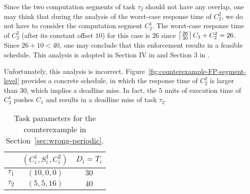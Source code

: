 Since the two computation segments of task $\tau_2$ should not have any overlap, one may think that during the analysis of the worst-case response time of $C_2^2$, we do not have to consider the computation segment $C_2^1$. The worst-case response time of $C_2^2$ (after its constant offset $10$) for this case is $26$ since $\left\lceil{\frac{26}{30}}\right\rceil C_1 + C_2^2 = 26$. 
Since $26+10 < 40$, one may conclude that this enforcement results in a feasible schedule. This analysis is adopted in Section IV in \cite{RTSS-KimANR13} and Section 3 in \cite{DBLP:journals/ieicet/DingTT09}. 

Unfortunately, this analysis is incorrect.
Figure~\ref{fig:counterexample-FP-segment-level} provides a concrete schedule, in which the response time of $C_2^2$ is larger than $30$, which implies a deadline miss. In fact, the $5$ units of execution time of $C_2^1$ pushes $C_1$ and results in a deadline miss of task $\tau_2$.

\begin{table} [t]
\centering
    \begin{tabular}{|c|c|c|}
 \hline
        & $(C_i^1, S_i^1, C_i^2)$ &  $D_i=T_i$\\ 
        \hline
        $\tau_1$ & $(10, 0, 0)$ &  $30$\\ 
        $\tau_2$ &  $(5, 5, 16)$ & $40$  \\ 
        \hline
    \end{tabular} 
    \caption{Task parameters for the counterexample in Section~\ref{sec:wrong-periodic}.}
    \label{table:ex-periodic}
\end{table}


